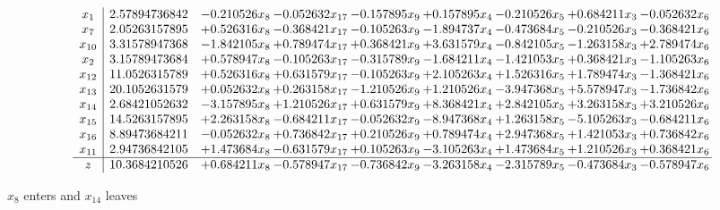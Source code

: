 \documentclass[10pt]{article}
\begin{document}
 \[\begin{array}{c| c c@{\hskip 2pt} c@{\hskip 2pt} c@{\hskip 2pt} c@{\hskip 2pt} c@{\hskip 2pt} c@{\hskip 2pt} c@{\hskip 2pt} }
 x_{1}   &  2.57894736842 & -0.210526 x_{8} & -0.052632 x_{17} & -0.157895 x_{9} & + 0.157895 x_{4} & -0.210526 x_{5} & + 0.684211 x_{3} & -0.052632 x_{6}\\
 x_{7}   &  2.05263157895 & + 0.526316 x_{8} & -0.368421 x_{17} & -0.105263 x_{9} & -1.894737 x_{4} & -0.473684 x_{5} & -0.210526 x_{3} & -0.368421 x_{6}\\
 x_{10}   &  3.31578947368 & -1.842105 x_{8} & + 0.789474 x_{17} & + 0.368421 x_{9} & + 3.631579 x_{4} & -0.842105 x_{5} & -1.263158 x_{3} & + 2.789474 x_{6}\\
 x_{2}   &  3.15789473684 & + 0.578947 x_{8} & -0.105263 x_{17} & -0.315789 x_{9} & -1.684211 x_{4} & -1.421053 x_{5} & + 0.368421 x_{3} & -1.105263 x_{6}\\
 x_{12}   &  11.0526315789 & + 0.526316 x_{8} & + 0.631579 x_{17} & -0.105263 x_{9} & + 2.105263 x_{4} & + 1.526316 x_{5} & + 1.789474 x_{3} & -1.368421 x_{6}\\
 x_{13}   &  20.1052631579 & + 0.052632 x_{8} & + 0.263158 x_{17} & -1.210526 x_{9} & + 1.210526 x_{4} & -3.947368 x_{5} & + 5.578947 x_{3} & -1.736842 x_{6}\\
 x_{14}   &  2.68421052632 & -3.157895 x_{8} & + 1.210526 x_{17} & + 0.631579 x_{9} & + 8.368421 x_{4} & + 2.842105 x_{5} & + 3.263158 x_{3} & + 3.210526 x_{6}\\
 x_{15}   &  14.5263157895 & + 2.263158 x_{8} & -0.684211 x_{17} & -0.052632 x_{9} & -8.947368 x_{4} & + 1.263158 x_{5} & -5.105263 x_{3} & -0.684211 x_{6}\\
 x_{16}   &  8.89473684211 & -0.052632 x_{8} & + 0.736842 x_{17} & + 0.210526 x_{9} & + 0.789474 x_{4} & + 2.947368 x_{5} & + 1.421053 x_{3} & + 0.736842 x_{6}\\
 x_{11}   &  2.94736842105 & + 1.473684 x_{8} & -0.631579 x_{17} & + 0.105263 x_{9} & -3.105263 x_{4} & + 1.473684 x_{5} & + 1.210526 x_{3} & + 0.368421 x_{6}\\
\hline
z    &  10.3684210526 & + 0.684211 x_{8} & -0.578947 x_{17} & -0.736842 x_{9} & -3.263158 x_{4} & -2.315789 x_{5} & -0.473684 x_{3} & -0.578947 x_{6}\\
\end{array}\]


 $ x_{8} $ enters and $ x_{14} $ leaves 
\end{document}
